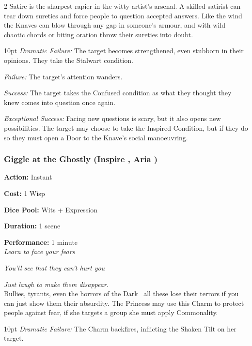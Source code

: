 \begin{multicols}{2}
\noindent Satire is the sharpest rapier in the witty artist's arsenal. A skilled satirist can tear down sureties and force people to question accepted answers. Like the wind the Knaves can blow through any gap in someone's armour, and with wild chaotic chords or biting oration throw their sureties into doubt. 

\begin{myindentpar}{10pt}    \emph{Dramatic Failure:} The target becomes strengthened, even stubborn in their opinions. They take the Stalwart condition. 

    \emph{Failure:} The target’s attention wanders.

    \emph{Success:} The target takes the Confused condition as what they thought they knew comes into question once again.

    \emph{Exceptional Success:} Facing new questions is scary, but it also opens new possibilities. The target may choose to take the Inspired Condition, but if they do so they must open a Door to the Knave's social manoeuvring. 

\end{myindentpar}

\subsubsection*{Giggle at the Ghostly (Inspire \textbullet\textbullet, Aria \textbullet)}

\noindent \textbf{Action:} Instant

\noindent \textbf{Cost:} 1 Wisp

\noindent \textbf{Dice Pool:} Wits + Expression 

\noindent \textbf{Duration:} 1 scene 

\noindent \textbf{Performance:} 1 minute \\	

\textit{Learn to face your fears}

\textit{You'll see that they can't hurt you}

\textit{Just laugh to make them disappear.} \\

\noindent Bullies, tyrants, even the horrors of the Dark \textendash\, all these lose their terrors if you can just show them their absurdity. The Princess may use this Charm to protect people against fear, if she targets a group she must apply Commonality. 

\begin{myindentpar}{10pt}    \emph{Dramatic Failure:} The Charm backfires, inflicting the Shaken Tilt on her target. 


\end{myindentpar}
\end{multicols}
